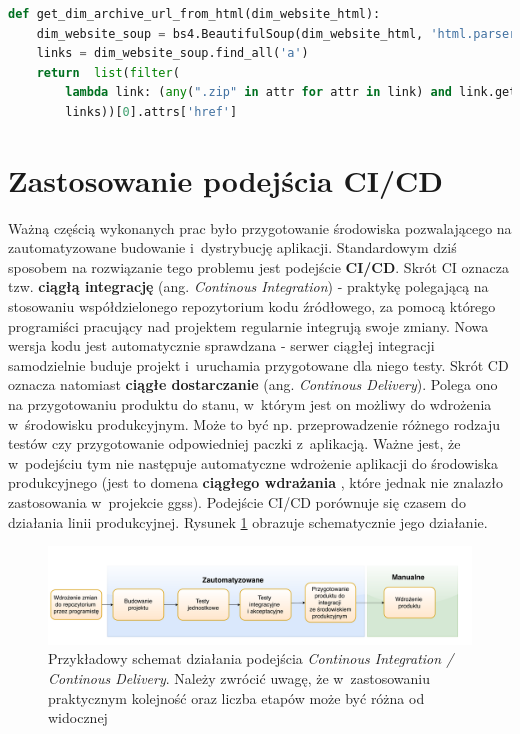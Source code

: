 \begin{lstlisting}[language=python, caption={Fragment skryptu \textit{dim\_download.py} odpowiedzialny za przetworzenie dokumentu HTML. Widoczne użycie elementów modułu \textit{BeautifulSoup4}.}, label={lst:bs4}]
def get_dim_archive_url_from_html(dim_website_html):
    dim_website_soup = bs4.BeautifulSoup(dim_website_html, 'html.parser')
    links = dim_website_soup.find_all('a')
    return  list(filter(
        lambda link: (any(".zip" in attr for attr in link) and link.getText().strip() == "dim.zip"), 
        links))[0].attrs['href']
\end{lstlisting}

\newpage

\section{Zastosowanie podejścia CI/CD}
Ważną częścią wykonanych prac było przygotowanie środowiska pozwalającego na zautomatyzowane budowanie i~dystrybucję aplikacji. Standardowym dziś sposobem na rozwiązanie tego problemu jest podejście \textbf{CI/CD}. Skrót CI oznacza tzw. \textbf{ciągłą integrację} (ang. \textit{Continous Integration}) - praktykę polegającą na stosowaniu współdzielonego repozytorium kodu źródłowego, za pomocą którego programiści pracujący nad projektem regularnie integrują swoje zmiany. Nowa wersja kodu jest automatycznie sprawdzana - serwer ciągłej integracji samodzielnie buduje projekt i~uruchamia przygotowane dla niego testy. Skrót CD oznacza natomiast \textbf{ciągłe dostarczanie} (ang. \textit{Continous Delivery}). Polega ono na przygotowaniu produktu do stanu, w~którym jest on możliwy do wdrożenia w~środowisku produkcyjnym. Może to być np. przeprowadzenie różnego rodzaju testów czy przygotowanie odpowiedniej paczki z~aplikacją. Ważne jest, że w~podejściu tym nie następuje automatyczne wdrożenie aplikacji do środowiska produkcyjnego (jest to domena \textbf{ciągłego wdrażania} \cite{CICDDef}, które jednak nie znalazło zastosowania w~projekcie \gls*{ggss}). Podejście CI/CD porównuje się czasem do działania linii produkcyjnej. Rysunek \ref{fig:cicd} obrazuje schematycznie jego działanie. 

\begin{figure}[H]
\centering
\includegraphics[width=\textwidth]{res/CICD.pdf}
\caption{Przykładowy schemat działania podejścia \textit{Continous Integration / Continous Delivery}. Należy zwrócić uwagę, że w~zastosowaniu praktycznym kolejność oraz liczba etapów może być różna od widocznej}
\label{fig:cicd}
\end{figure}

